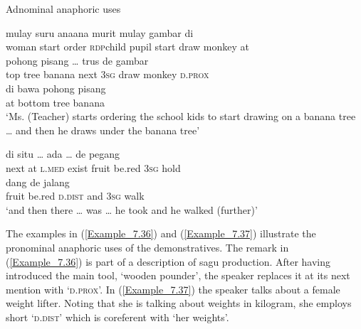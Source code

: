 {\begin{styleExampleTitle}
Adnominal anaphoric uses
\end{styleExampleTitle}

\ea
\label{Example_7.34}
 {{mulay}} {{suru}} {{ana{\Tilde}ana}} {{murit}} {{mulay}} {{gambar}} {} {di}\\ %
 {woman}  {start}  {order}  {\textsc{rdp}{\Tilde}child}  {pupil}  {start}  {draw}  monkey  at\\
  {pohong}  {pisang}  {\ldots}  trus  {de}  {gambar}  {}  {}\\
 {top}  {tree}  {banana}  { }  next  {\textsc{3sg}}  {draw}  {monkey}  {\textsc{d.prox}}\\
\gll di  {bawa}  {pohong}  {pisang}\\
 at  {bottom}  {tree}  {banana}\\
\glt 
‘Ms. (Teacher) starts ordering the school kids to start drawing  on a banana tree {\ldots} and then he draws  under the banana tree’ \textstyleExampleSource{[081109-002-JR.0001-0002]}
\z

\ea
\label{Example_7.35}
 {di} {{situ}} {\ldots} {ada} {{}} {} {\ldots} {de} {pegang}\\ %
 next  at  {\textsc{l.med}}  { }  exist  {fruit}  be.red  { }   \textsc{3sg}  hold\\
\gll {}  {}  {}  dang  de  {jalang}\\
 fruit  {be.red}  {\textsc{d.dist}}  and  \textsc{3sg}  {walk}\\
\glt 
‘and then there {\ldots} was  {\ldots} he took  and he walked (further)’ \textstyleExampleSource{[080922-010a-CvNF.0218-219]}
\z



The examples in (\ref{Example_7.36}) and (\ref{Example_7.37}) illustrate the pronominal anaphoric uses of the demonstratives. The remark in (\ref{Example_7.36}) is part of a description of sagu production. After having introduced the main tool,  ‘wooden pounder’, the speaker replaces it at its next mention with  ‘\textsc{d.prox}’. In (\ref{Example_7.37}) the speaker talks about a female weight lifter. Noting that she is talking about weights in kilogram, she employs short  ‘\textsc{d.dist}’ which is coreferent with  ‘her weights’.


}
